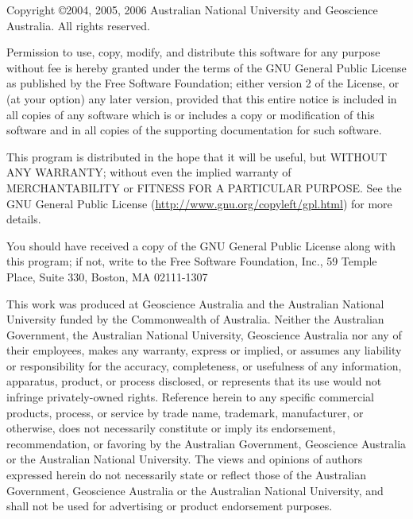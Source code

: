 %
%
%
%
%
%
%
%

\vspace*{0.5in}

Copyright \copyright 2004, 2005, 2006 Australian National University and Geoscience Australia. All rights reserved.

Permission to use, copy, modify, and distribute this software for any
purpose without fee is hereby granted under the terms of the GNU
General Public License as published by the Free Software Foundation;
either version 2 of the License, or (at your option) any later
version, provided that this entire notice is included in all copies
of any software which is or includes a copy or modification of this
software and in all copies of the supporting documentation for such
software.

This program is distributed in the hope that it will be useful,
but WITHOUT ANY WARRANTY; without even the implied warranty of
MERCHANTABILITY or FITNESS FOR A PARTICULAR PURPOSE.  See the
GNU General Public License (\url{http://www.gnu.org/copyleft/gpl.html})
for more details.

You should have received a copy of the GNU General Public License
along with this program; if not, write to the Free Software
Foundation, Inc., 59 Temple Place, Suite 330, Boston, MA  02111-1307

This work was produced at Geoscience Australia and the Australian
National University funded by the Commonwealth of Australia. Neither
the Australian Government, the Australian National University,
Geoscience Australia nor any of their employees, makes any warranty,
express or implied, or assumes any liability or responsibility for
the accuracy, completeness, or usefulness of any information,
apparatus, product, or process disclosed, or represents that its use
would not infringe privately-owned rights. Reference herein to any
specific commercial products, process, or service by trade name,
trademark, manufacturer, or otherwise, does not necessarily
constitute or imply its endorsement, recommendation, or favoring by
the Australian Government, Geoscience Australia or the Australian
National University.  The views and opinions of authors expressed
herein do not necessarily state or reflect those of the Australian
Government, Geoscience Australia or the Australian National
University, and shall not be used for advertising or product
endorsement purposes.

